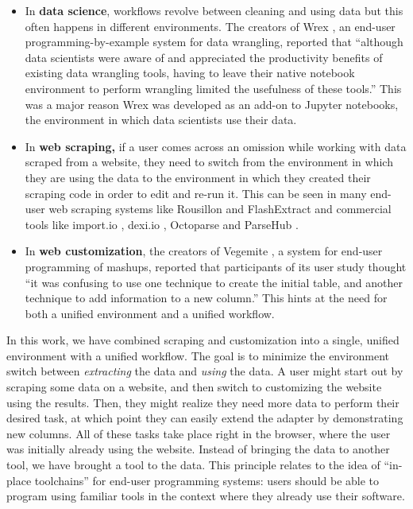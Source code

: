 \documentclass[sigconf,10pt]{acmart}
\providecommand{\tightlist}{%
  \setlength{\itemsep}{0pt}\setlength{\parskip}{0pt}}
\begin{document}
\begin{itemize}
\tightlist
\item
  In \textbf{data science}, workflows revolve between cleaning and using
  data but this often happens in different environments. The creators of
  Wrex \citep{drosos2020}, an end-user programming-by-example system for
  data wrangling, reported that ``although data scientists were aware of
  and appreciated the productivity benefits of existing data wrangling
  tools, having to leave their native notebook environment to perform
  wrangling limited the usefulness of these tools.'' This was a major
  reason Wrex was developed as an add-on to Jupyter notebooks, the
  environment in which data scientists use their data.
\item
  In \textbf{web scraping,} if a user comes across an omission while
  working with data scraped from a website, they need to switch from the
  environment in which they are using the data to the environment in
  which they created their scraping code in order to edit and re-run it.
  This can be seen in many end-user web scraping systems like Rousillon
  \citep{chasins2018}and FlashExtract \citep{le2014} and commercial
  tools like import.io \citep{import.io}, dexi.io \citep{dexi.io},
  Octoparse \citep{octoparse} and ParseHub \citep{parsehub}.
\item
  In \textbf{web customization}, the creators of Vegemite
  \citep{lin2009}, a system for end-user programming of mashups,
  reported that participants of its user study thought ``it was
  confusing to use one technique to create the initial table, and
  another technique to add information to a new column.'' This hints at
  the need for both a unified environment and a unified workflow.
\end{itemize}

In this work, we have combined scraping and customization into a single,
unified environment with a unified workflow. The goal is to minimize the
environment switch between \emph{extracting} the data and \emph{using}
the data. A user might start out by scraping some data on a website, and
then switch to customizing the website using the results. Then, they
might realize they need more data to perform their desired task, at
which point they can easily extend the adapter by demonstrating new
columns. All of these tasks take place right in the browser, where the
user was initially already using the website. Instead of bringing the
data to another tool, we have brought a tool to the data. This principle
relates to the idea of ``in-place toolchains'' \citep{zotero-60} for
end-user programming systems: users should be able to program using
familiar tools in the context where they already use their software.
\end{document}
